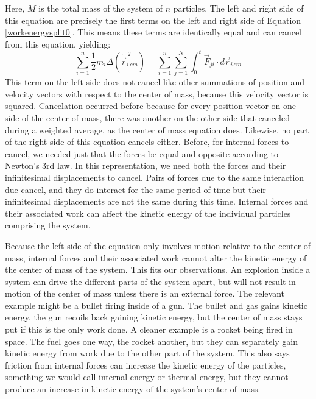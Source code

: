 \documentclass[10pt]{article}
\begin{document}
Here, $M$ is the total mass of the system of $n$ particles. 
The left and right side of this equation are precisely the first 
terms on the left and right side of Equation \ref{workenergysplit0}. This 
means these terms are identically equal and can cancel from this equation, 
yielding:
\begin{equation}
    \sum_{i=1}^n \frac{1}{2}m_i\Delta(\dot{\vec{r}}_{i\,cm}^{\,2})
        = 
        \sum_{i=1}^n \sum_{j=1}^N \int_{0}^{t} \vec{F}_{ji}\cdot 
        d\vec{r}_{i\,cm} 
\end{equation}
This term on the left side does not cancel like other summations of 
position and velocity vectors with respect to the center of mass, because 
this velocity vector is squared. Cancelation occurred before because 
for every position vector on one side of the center of mass, there 
was another on the other side that canceled during a weighted average, 
as the center of mass equation does. Likewise, no part of the right 
side of this equation cancels either. Before, for internal forces 
to cancel, we needed just that the forces be equal and opposite 
according to Newton's 3rd law. In this 
representation, we need both the forces and their infinitesimal displacements 
to cancel. Pairs of forces due to the same interaction due cancel, and 
they do interact for the same period of time but 
their infinitesimal displacements are not the same during this time. 
Internal forces and their associated work can affect the kinetic energy of the 
individual particles comprising the system. 

Because the left side of the 
equation only involves motion relative to the center of mass, 
internal forces and their associated work cannot alter the kinetic 
energy of the center of mass of the system. This fits our observations. 
An explosion inside a system can drive the different parts of the system 
apart, but will not result in motion of the center of mass unless there is 
an external force. The relevant example might be a bullet firing inside 
of a gun. The bullet and gas gains kinetic energy, the gun recoils back 
gaining kinetic energy, but the center of mass stays put if this 
is the only work done. A cleaner example is a rocket 
being fired in space. The fuel goes one way, the rocket another, but 
they can separately gain kinetic energy from work due to the other 
part of the system. This also says friction from internal forces can 
increase the kinetic energy of the particles, something 
we would call internal energy or thermal energy, but they cannot produce
an increase in kinetic energy of the system's center of mass.
\end{document}
